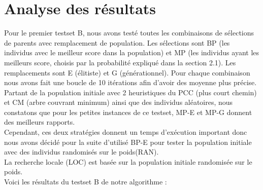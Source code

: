 \documentclass[12pt,a4paper]{article}
\begin{document}
\section{Analyse des résultats}
Pour le premier testset B, nous avons testé toutes les combinaisons de sélections de parents avec remplacement de population. Les sélections sont BP (les individus avec le meilleur score dans la population) et MP (les individus ayant les meilleurs score, choisis par la probabilité expliqué dans la section 2.1). Les remplacements sont E (élitiste) et G (générationnel). Pour chaque combinaison nous avons fait une boucle de 10 itérations afin d'avoir des moyenne plus précise. Partant de la population initiale avec 2 heuristiques du PCC (plus court chemin) et CM (arbre couvrant minimum) ainsi que des individus aléatoires, nous constatons que pour les petites instances de ce testset, MP-E et MP-G donnent des meilleurs rapports.\\
Cependant, ces deux stratégies donnent un temps d'exécution important donc nous avons décidé pour la suite d'utilisé BP-E pour tester la population initiale avec des individus randomisés sur le poids(RAN).\\
La recherche locale (LOC) est basée sur la population initiale randomisée sur le poids.\\
Voici les résultats du testset B de notre algorithme :
\end{document}

